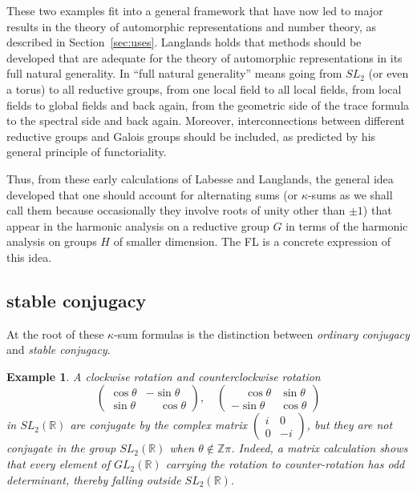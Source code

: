 \documentclass[brochure,english,12pt]{bourbaki}
\newtheorem{example}[equation]{Example}
\newcommand{\ring}[1]{\mathbb{#1}}
\begin{document}
These two examples fit into a general framework that have now led to major
results in the theory of automorphic representations and number
theory, as described in Section~\ref{sec:uses}.  Langlands holds that methods
should be developed that are adequate for the theory of automorphic
representations in its full natural generality.  In ``full natural
generality'' means going from $SL_2$ (or even a torus) to all
reductive groups, from one local field to all local fields, from local
fields to global fields and back again, from the geometric side of the
trace formula to the spectral side and back again.  Moreover,
interconnections between different reductive groups and Galois groups
should be included, as predicted by his general principle of
functoriality.


Thus, from these early calculations of Labesse and Langlands, the
general idea developed that one should account for alternating sums
(or $\kappa$-sums as we shall call them because occasionally they
involve roots of unity other than $\pm1$) that appear in the harmonic
analysis on a reductive group $G$ in terms of the harmonic analysis on
groups $H$ of smaller dimension.  The FL is a concrete
expression of this idea.


\subsection{stable conjugacy}\label{sec:stable}

At the root of these $\kappa$-sum formulas is the distinction between
{\it ordinary conjugacy} and {\it stable conjugacy}.  
\begin{example}
A clockwise rotation and counterclockwise rotation
\[
\begin{pmatrix}\cos\theta &-\sin\theta\\\sin\theta &\phantom{-}\cos\theta\end{pmatrix},\quad
\begin{pmatrix}\phantom{-}\cos\theta &\sin\theta\\-\sin\theta &\cos\theta\end{pmatrix}
\]
in $SL_2(\ring{R})$ are conjugate by the complex matrix $\begin{pmatrix}i&0\\0&-i\end{pmatrix}$, 
but they are not conjugate
in the group $SL_2(\ring{R})$ when $\theta\not\in\ring{Z}\pi$.  Indeed,
a matrix calculation shows
that every element of $GL_2(\ring{R})$ carrying the rotation to
counter-rotation has odd determinant, thereby falling outside $SL_2(\ring{R})$.
\end{example}
\end{document}
